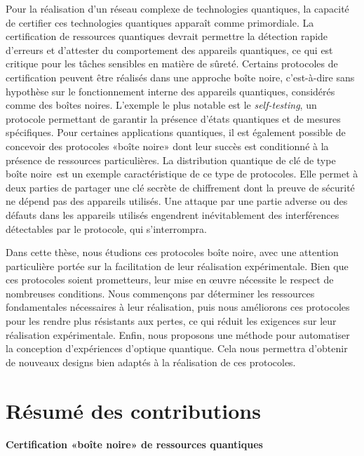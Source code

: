 \medbreak

Pour la réalisation d'un réseau complexe de technologies quantiques, la capacité de certifier ces technologies quantiques apparaît comme primordiale. 
La certification de ressources quantiques devrait permettre la détection rapide d'erreurs et d'attester du comportement des appareils quantiques, ce qui est critique pour les tâches sensibles en matière de sûreté.
Certains protocoles de certification peuvent être réalisés dans une approche \guillemotleft boîte noire\guillemotright, c'est-à-dire sans hypothèse sur le fonctionnement interne des appareils quantiques, considérés comme des boîtes noires. 
L'exemple le plus notable est le \textit{self-testing}, un protocole permettant de garantir la présence d'états quantiques et de mesures spécifiques.
Pour certaines applications quantiques, il est également possible de concevoir des protocoles «boîte noire» dont leur succès est conditionné à la présence de ressources particulières.
La distribution quantique de clé de type \guillemotleft boîte noire\guillemotright~est un exemple caractéristique de ce type de protocoles. Elle permet à deux parties de partager une clé secrète de chiffrement dont la preuve de sécurité ne dépend pas des appareils utilisés. 
Une attaque par une partie adverse ou des défauts dans les appareils utilisés engendrent inévitablement des interférences détectables par le protocole, qui s'interrompra.

\medbreak

Dans cette thèse, nous étudions ces protocoles \guillemotleft boîte noire\guillemotright, avec une attention particulière portée sur la facilitation de leur réalisation expérimentale.
Bien que ces protocoles soient prometteurs, leur mise en œuvre nécessite le respect de nombreuses conditions. 
Nous commençons par déterminer les ressources fondamentales nécessaires à leur réalisation, puis nous améliorons ces protocoles pour les rendre plus résistants aux pertes, ce qui réduit les exigences sur leur réalisation expérimentale. 
Enfin, nous proposons une méthode pour automatiser la conception d'expériences d'optique quantique. 
Cela nous permettra d'obtenir de nouveaux designs bien adaptés à la réalisation de ces protocoles.


\section{Résumé des contributions}

\paragraph{Certification «boîte noire» de ressources quantiques} 

